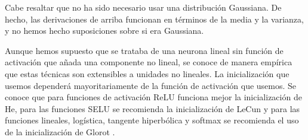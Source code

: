 Cabe resaltar que no ha sido necesario usar una distribución Gaussiana. De hecho, las derivaciones de arriba funcionan en términos de la media y la varianza, y no hemos hecho suposiciones sobre si era Gaussiana. 


Aunque hemos supuesto que se trataba de una neurona lineal sin función de activación que añada una componente no lineal, se conoce de manera empírica que estas técnicas son extensibles a unidades no lineales. La inicialización que usemos dependerá mayoritariamente de la función de activación que usemos. Se conoce que para funciones de activación ReLU funciona mejor la inicialización de He, para las funciones SELU se recomienda la inicialización de LeCun y para las funciones lineales, logística, tangente hiperbólica y softmax se recomienda el uso de la inicialización de Glorot \cite{murphy2022probabilistic}.